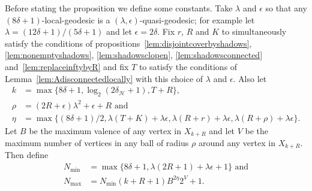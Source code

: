 Before stating the proposition we define some constants. Take $\lambda$ and
$\epsilon$ so that any $(8\delta + 1)$-local-geodesic is a $(\lambda,
\epsilon)$-quasi-geodesic; for example let $\lambda = (12\delta + 1)/(5\delta +
1)$ and let $\epsilon = 2\delta$. Fix $r$, $R$ and $K$ to simultaneously
satisfy the conditions of propositions~\ref{lem:disjointcoverbyshadows},
\ref{lem:nonemptyshadows}, \ref{lem:shadowsclopen}, \ref{lem:shadowsconnected}
and~\ref{lem:replaceinftybyR} and fix $T$ to satisfy the conditions of
Lemma~\ref{lem:Adisconnectedlocally} with this choice of $\lambda$ and
$\epsilon$. Also let 
\begin{align*}
     k &= \max\{8\delta + 1, \log_2(2\delta_\mathcal{H} + 1), T + R\},\\
  \rho &= (2R + \epsilon)\lambda^2 + \epsilon + R \text{ and}\\
  \eta &= \max\{(8\delta + 1)/2, \lambda(T + K) + \lambda\epsilon, \lambda(R + r) + \lambda\epsilon, \lambda(R + \rho) + \lambda\epsilon\}.
\end{align*}
Let $B$ be the maximum valence of any
vertex in $X_{k + R}$ and let $V$ be the maximum number of vertices in any ball
of radius $\rho$ around any vertex in $X_{k + R}$. Then define 
\begin{align*}
  N_\text{min} &= \max\{8\delta+1, \lambda(2R+1) + \lambda\epsilon + 1\} \text{ and}\\
  N_\text{max} &= N_\text{min} \left(k + R + 1\right) B^{2\eta} 2^V + 1.
\end{align*}


